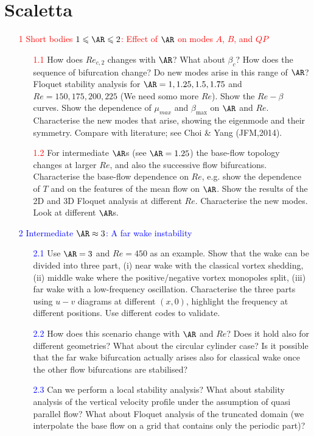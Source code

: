 \section{Scaletta}

\begin{itemize}

  \item[\textcolor{red}{1}] \textcolor{red}{Short bodies $1 \le \AR \le 2$: Effect of $\AR$ on modes $A$, $B$, and $QP$}
  \begin{itemize}
    \item[\textcolor{red}{1.1}] How does $Re_{c,2}$ changes with $\AR$? What about $\beta_c$? How does the sequence of bifurcation change? Do new modes arise in this range of $\AR$? Floquet stability analysis for $\AR=1,1.25,1.5,1.75$ and $Re=150,175,200,225$ (We need somo more $Re$). Show the $Re-\beta$ curves. Show the dependence of $\mu_{max}$ and $\beta_{\max}$ on $\AR$ and $Re$. Characterise the new modes that arise, showing the eigenmode and their symmetry. Compare with literature; see Choi \& Yang (JFM,2014).
    \item[\textcolor{red}{1.2}] For intermediate $\AR$s (see $\AR=1.25$) the base-flow topology changes at larger $Re$, and also the successive flow bifurcations. Characterise the base-flow dependence on $Re$, e.g. show the dependence of $T$ and on the features of the mean flow on $\AR$. Show the results of the 2D and 3D Floquet analysis at different $Re$. Characterise the new modes. Look at different $\AR$s.
  \end{itemize}
  
  \item[\textcolor{blue}{2}] \textcolor{blue}{Intermediate $\AR \approx 3$: A far wake instability}
  \begin{itemize}
    \item[\textcolor{blue}{2.1}] Use $\AR=3$ and $Re=450$ as an example. Show that the wake can be divided into three part, (i) near wake with the classical vortex shedding, (ii) middle wake where the positive/negative vortex monopoles split, (iii) far wake with a low-frequency oscillation. Characterise the three parts using $u-v$ diagrams at different $(x,0)$, highlight the frequency at different positions. Use different codes to validate.
    \item[\textcolor{blue}{2.2}] How does this scenario change with $\AR$ and $Re$? Does it hold also for different geometries? What about the circular cylinder case? Is it possible that the far wake bifurcation actually arises also for classical wake once the other flow bifurcations are stabilised?
    \item[\textcolor{blue}{2.3}] Can we perform a local stability analysis? What about stability analysis of the vertical velocity profile under the assumption of quasi parallel flow? What about Floquet analysis of the truncated domain (we interpolate the base flow on a grid that contains only the periodic part)?
  \end{itemize}
  

\end{itemize}
